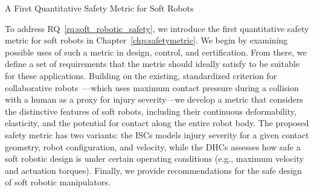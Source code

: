 \begin{contribution}\label{contrib:safety_metric}
    A First Quantitative Safety Metric for Soft Robots
\end{contribution}
To address \gls{RQ}~\ref{rq:soft_robotic_safety}, we introduce the first quantitative safety metric for soft robots in Chapter~\ref{chp:safetymetric}. We begin by examining possible uses of such a metric in design, control, and certification. From there, we define a set of requirements that the metric should ideally satisfy to be suitable for these applications.
% 
Building on the existing, standardized criterion for collaborative robots~\citep{Isots_15066_2016}—which uses maximum contact pressure during a collision with a human as a proxy for injury severity—we develop a metric that considers the distinctive features of soft robots, including their continuous deformability, elasticity, and the potential for contact along the entire robot body. The proposed safety metric has two variants: the \glspl{ISC} models injury severity for a given contact geometry, robot configuration, and velocity, while the \glspl{DHC} assesses how safe a soft robotic design is under certain operating conditions (e.g., maximum velocity and actuation torques). Finally, we provide recommendations for the safe design of soft robotic manipulators.

